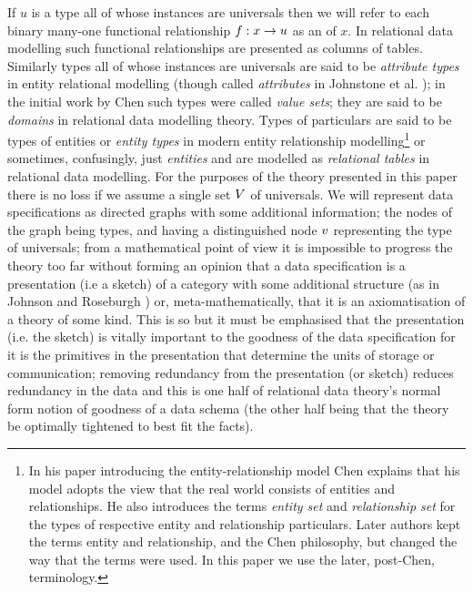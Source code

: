 If $u$ is a type all of whose instances are universals then we will refer to each binary many-one functional relationship $f: x \rightarrow u$ as an  of $x$. In relational data modelling such functional relationships are presented as columns of tables. Similarly types all of whose instances are universals  are said to be \textit{attribute types} in entity relational modelling  (though called \textit{attributes} in Johnstone et al. \cite{Johnson2002ERA}); in the initial work by Chen such types were called \textit{value sets}; they are said to be \textit{domains} in relational data modelling theory. Types of particulars are said to be types of entities or \textit{entity types} in modern entity relationship modelling\footnote{In  his paper  introducing the entity-relationship model Chen explains that his model adopts the view that the real world consists of entities and relationships. He also introduces the  terms \textit{entity set} and \textit{relationship set} for the types of respective entity and relationship particulars. Later authors kept the terms entity and relationship, and the Chen philosophy, but changed the way that the terms were used. In this paper we use the later, post-Chen, terminology.} or sometimes, confusingly, just \textit{entities}  and are modelled as \textit{relational tables} in relational data modelling. For the purposes of the theory presented in this paper there is no loss if we assume a single set $V$ of universals.  We will represent data specifications as directed graphs with some additional information; the nodes of the graph being types, and having a distinguished node $v$ representing the type of universals; from a mathematical point of view it is impossible to progress the theory too far without forming an opinion that a data specification is a presentation (i.e a sketch) of a category with some additional structure (as in Johnson and Roseburgh \cite{johnson2002REL}) or, meta-mathematically, that it is an axiomatisation of a theory of some kind. This is so but it must be emphasised that the presentation (i.e. the sketch) is vitally important to the goodness of the data specification for it is the primitives in the presentation that determine the units of storage or communication; removing redundancy from the presentation (or sketch) reduces redundancy in the data and this is one half of relational data theory's  normal form notion of goodness of a data schema (the other half being that the theory be optimally tightened to best fit the facts). 


